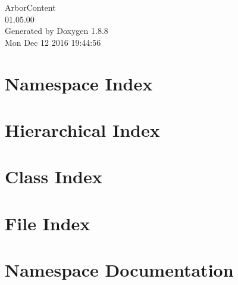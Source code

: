 \documentclass[twoside]{book}
\newcommand{\+}{\discretionary{\mbox{\scriptsize$\hookleftarrow$}}{}{}}
\newcommand{\clearemptydoublepage}{%
  \newpage{\pagestyle{empty}\cleardoublepage}%
}
\begin{document}
\begin{titlepage}
\vspace*{7cm}
\begin{center}%
{\Large Arbor\+Content \\[1ex]\large 01.\+05.\+00 }\\
\vspace*{1cm}
{\large Generated by Doxygen 1.8.8}\\
\vspace*{0.5cm}
{\small Mon Dec 12 2016 19:44:56}\\
\end{center}
\end{titlepage}
\clearemptydoublepage
\tableofcontents
\clearemptydoublepage
{}

\chapter{Namespace Index}

\chapter{Hierarchical Index}

\chapter{Class Index}

\chapter{File Index}

\chapter{Namespace Documentation}


\end{document}
